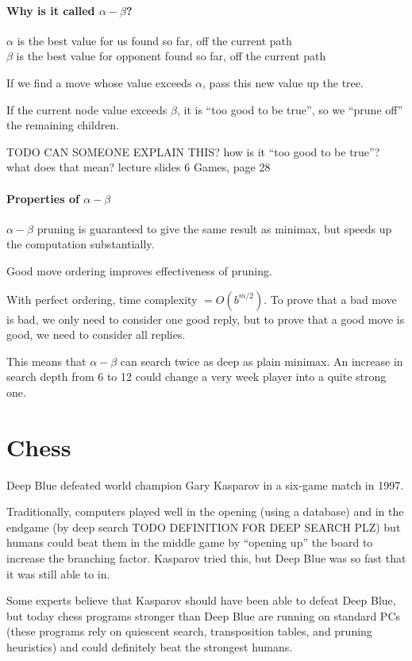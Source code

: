 \paragraph{Why is it called $\alpha-\beta$?}
$\alpha$ is the best value for us found so far, off the current path\\
$\beta$ is the best value for opponent found so far, off the current path

If we find a move whose value exceeds $\alpha$, pass this new value up the
tree.

If the current node value exceeds $\beta$, it is ``too good to be true'', so we
``prune off'' the remaining children.

TODO CAN SOMEONE EXPLAIN THIS? how is it ``too good to be true''? what does that mean?
lecture slides 6 Games, page 28

\paragraph{Properties of $\alpha-\beta$}
$\alpha-\beta$ pruning is guaranteed to give the same result as minimax, but
speeds up the computation substantially.

Good move ordering improves effectiveness of pruning.

With perfect ordering, time complexity $= O(b^{m/2})$. To prove that a bad move
is bad, we only need to consider one good reply, but to prove that a good move
is good, we need to consider all replies.

This means that $\alpha-\beta$ can search twice as deep as plain minimax. An
increase in search depth from 6 to 12 could change a very week player into a
quite strong one.

\section{Chess}
Deep Blue defeated world champion Gary Kasparov in a six-game match in 1997.

Traditionally, computers played well in the opening (using a database) and in
the endgame (by deep search TODO DEFINITION FOR DEEP SEARCH PLZ) but humans could
beat them in the middle game by ``opening up'' the board to increase the
branching factor. Kasparov tried this, but Deep Blue was so fast that it was
still able to in.

Some experts believe that Kasparov should have been able to defeat Deep Blue,
but today chess programs stronger than Deep Blue are running on standard PCs
(these programs rely on quiescent search, transposition tables, and pruning
heuristics) and could definitely beat the strongest humans.

